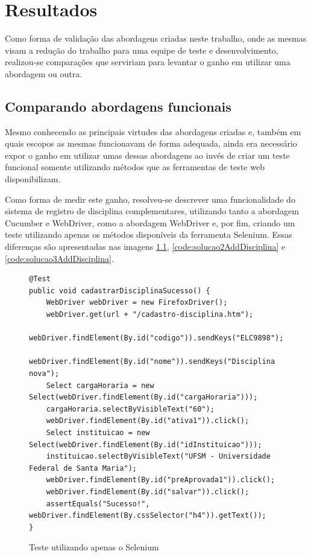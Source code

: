 \documentclass[tg]{mdtufsm}
\begin{document}
\chapter{Resultados}
Como forma de validação das abordagens criadas neste trabalho, onde as mesmas visam a redução do trabalho para uma equipe de teste e desenvolvimento, realizou-se comparações que serviriam para levantar o ganho em utilizar uma abordagem ou outra. 

\section{Comparando abordagens funcionais}
Mesmo conhecendo as principais virtudes das abordagens criadas e, também em quais escopos as mesmas funcionavam de forma adequada, ainda era necessário expor o ganho em utilizar umas dessas abordagens ao invés de criar um teste funcional somente utilizando métodos que as ferramentas de teste web disponibilizam.

Como forma de medir este ganho, resolveu-se descrever uma funcionalidade do sistema de registro de disciplina complementares, utilizando tanto a abordagem Cucumber e WebDriver, como a abordagem WebDriver e, por fim, criando um teste utilizando apenas os métodos disponíveis da ferramenta Selenium. Essas diferenças são apresentadas nas imagens \ref{code:seleniumAddDisciplina}, \ref{code:solucao2AddDisciplina} e \ref{code:solucao3AddDisciplina}.


\begin{figure}[!htt]
	\begin{lstlisting}
@Test
public void cadastrarDisciplinaSucesso() {
    WebDriver webDriver = new FirefoxDriver();
    webDriver.get(url + "/cadastro-disciplina.htm");
    webDriver.findElement(By.id("codigo")).sendKeys("ELC9898");
    webDriver.findElement(By.id("nome")).sendKeys("Disciplina nova");
    Select cargaHoraria = new Select(webDriver.findElement(By.id("cargaHoraria")));
    cargaHoraria.selectByVisibleText("60");
    webDriver.findElement(By.id("ativa1")).click();
    Select instituicao = new Select(webDriver.findElement(By.id("idInstituicao")));
    instituicao.selectByVisibleText("UFSM - Universidade Federal de Santa Maria");
    webDriver.findElement(By.id("preAprovada1")).click();
    webDriver.findElement(By.id("salvar")).click();
    assertEquals("Sucesso!", webDriver.findElement(By.cssSelector("h4")).getText());
}
	\end{lstlisting}
	\caption{Teste utilizando apenas o Selenium}
	\label{code:seleniumAddDisciplina}
\end{figure}
\end{document}
